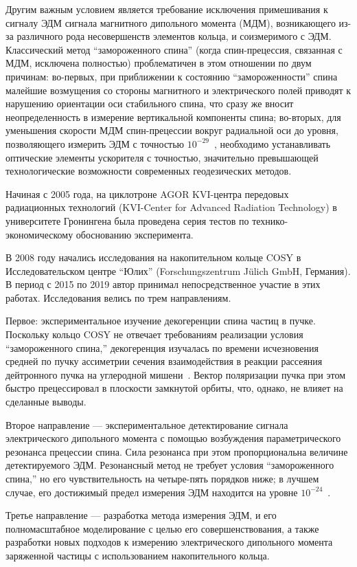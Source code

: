 Другим важным условием является требование исключения примешивания к сигналу ЭДМ сигнала магнитного дипольного момента (МДМ), возникающего из-за различного рода несовершенств элементов кольца, и соизмеримого с ЭДМ. 
Классический метод ``замороженного спина'' (когда спин-прецессия, связанная с МДМ, исключена полностью) проблематичен в этом отношении по двум причинам: 
во-первых, при приближении к состоянию ``замороженности'' спина малейшие возмущения со стороны магнитного и электрического полей приводят к нарушению ориентации оси стабильного спина, что сразу же вносит неопределенность в измерение вертикальной компоненты спина; 
во-вторых, для уменьшения скорости МДМ спин-прецессии вокруг радиальной оси до уровня, позволяющего измерить ЭДМ с точностью $10^{-29}$~\ecm, необходимо устанавливать оптические элементы ускорителя с точностью, значительно превышающей технологические возможности современных геодезических методов.

Начиная с 2005 года, на циклотроне AGOR KVI-центра передовых радиационных технологий (KVI-Center for Advanced Radiation Technology) в университете Гронингена была проведена серия тестов по технико-экономическому обоснованию эксперимента.

В 2008 году начались исследования на накопительном кольце COSY в Исследовательском центре ``Юлих'' (Forschungszentrum J\"ulich GmbH, Германия). В период с 2015 по 2019 автор принимал непосредственное участие в этих работах. Исследования велись по трем направлениям.

Первое: экспериментальное изучение декогеренции спина частиц в пучке. Поскольку кольцо COSY не отвечает требованиям реализации условия ``замороженного спина,''  декогеренция изучалась по времени исчезновения средней по пучку ассиметрии сечения взаимодействия в реакции рассеяния дейтронного пучка на углеродной мишени~\cite{COSY:SCT:IPAC15}. Вектор поляризации пучка при этом быстро прецессировал в плоскости замкнутой орбиты, что, однако, не влияет на сделанные выводы. 

Второе направление --- экспериментальное детектирование сигнала электрического дипольного момента с помощью возбуждения параметрического резонанса прецессии спина. Сила резонанса при этом пропорциональна величине детектируемого ЭДМ. Резонансный метод не требует условия ``замороженного спина,'' но его чувствительность на четыре-пять порядков ниже; в лучшем случае, его достижимый предел измерения ЭДМ находится на уровне $10^{-24}$~\ecm. 

Третье направление --- разработка метода измерения ЭДМ, и его полномасштабное моделирование с целью его совершенствования, а также  разработки новых подходов к измерению электрического дипольного момента заряженной частицы с использованием накопительного кольца.

